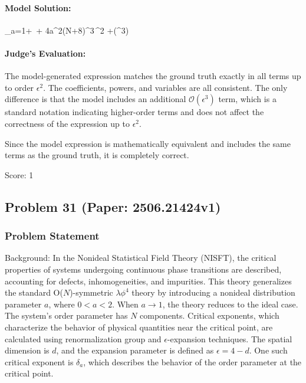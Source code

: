 \documentclass[10pt]{article}
\begin{document}
\paragraph*{Model Solution:}
\displaystyle 
\gamma_{a}=1+\,\epsilon
+
{4a^{2}(N+8)^{3}}\,\epsilon^{2}
+(\epsilon^{3})

\paragraph*{Judge's Evaluation:}

The model-generated expression matches the ground truth exactly in all terms up to order \(\epsilon^2\). The coefficients, powers, and variables are all consistent. The only difference is that the model includes an additional \(\mathcal{O}(\epsilon^{3})\) term, which is a standard notation indicating higher-order terms and does not affect the correctness of the expression up to \(\epsilon^2\).

Since the model expression is mathematically equivalent and includes the same terms as the ground truth, it is completely correct.

Score: 1

\newpage
\subsection*{Problem 31 (Paper: 2506.21424v1)}
\subsubsection*{Problem Statement}
Background:
In the Nonideal Statistical Field Theory (NISFT), the critical properties of systems undergoing continuous phase transitions are described, accounting for defects, inhomogeneities, and impurities. This theory generalizes the standard O($N$)-symmetric $\lambda\phi^4$ theory by introducing a nonideal distribution parameter $a$, where $0 < a < 2$. When $a \rightarrow 1$, the theory reduces to the ideal case. The system's order parameter has $N$ components. Critical exponents, which characterize the behavior of physical quantities near the critical point, are calculated using renormalization group and $\epsilon$-expansion techniques. The spatial dimension is $d$, and the expansion parameter is defined as $\epsilon = 4 - d$. One such critical exponent is $\delta_a$, which describes the behavior of the order parameter at the critical point.
\end{document}
